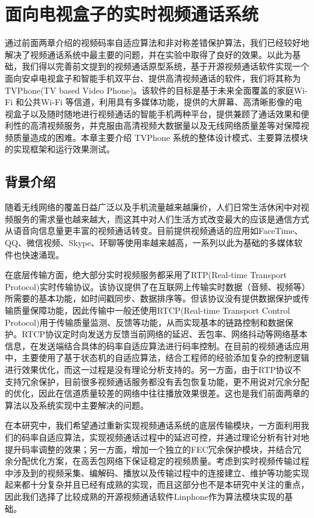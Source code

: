\chapter{面向电视盒子的实时视频通话系统}
\label{chap:system}
通过前面两章介绍的视频码率自适应算法和非对称差错保护算法，我们已经较好地解决了视频通话系统中最主要的问题，并在实验中取得了良好的效果。以此为基础，我们得以完善前文提到的视频通话原型系统，基于开源视频通话软件实现一个面向安卓电视盒子和智能手机双平台、提供高清视频通话的软件，我们将其称为TVPhone(TV based Video Phone)。该软件的目标是基于未来全面覆盖的家庭Wi-Fi 和公共Wi-Fi 等信道，利用具有多媒体功能，提供的大屏幕、高清晰影像的电视盒子以及随时随地进行视频通话的智能手机两种平台，提供兼顾了通话效果和便利性的高清视频服务，并克服由高清视频大数据量以及无线网络质量差等对保障视频质量造成的困难。本章主要介绍 TVPhone 系统的整体设计模式、主要算法模块的实现框架和运行效果测试。

\section{背景介绍}
随着无线网络的覆盖日益广泛以及手机流量越来越廉价，人们日常生活休闲中对视频服务的需求量也越来越大，而这其中对人们生活方式改变最大的应该是通信方式从语音向信息量更丰富的视频通话转变。目前提供视频通话的应用如FaceTime、QQ、微信视频、Skype、环聊等使用率越来越高，一系列以此为基础的多媒体软件也快速涌现。

在底层传输方面，绝大部分实时视频服务都采用了RTP(Real-time Transport Protocol)实时传输协议。该协议提供了在互联网上传输实时数据（音频、视频等）所需要的基本功能，如时间戳同步、数据排序等。但该协议没有提供数据保护或传输质量保障功能，因此传输中一般还使用RTCP(Real-time Transport Control Protocol)用于传输质量监测、反馈等功能，从而实现基本的链路控制和数据保护。RTCP协议定时向发送方反馈当前网络的延迟、丢包率、网络抖动等网络基本信息，在发送端结合具体的码率自适应算法进行码率控制。在目前的视频通话应用中，主要使用了基于状态机的自适应算法，结合工程师的经验添加复杂的控制逻辑进行效果优化，而这一过程是没有理论分析支持的。另一方面，由于RTP协议不支持冗余保护，目前很多视频通话服务都没有丢包恢复功能，更不用说对冗余分配的优化，因此在信道质量较差的网络中往往播放效果很差。这也是我们前面两章的算法以及系统实现中主要解决的问题。

在本研究中，我们希望通过重新实现视频通话系统的底层传输模块，一方面利用我们的码率自适应算法，实现视频通话过程中的延迟可控，并通过理论分析有针对地提升码率调整的效果；另一方面，增加一个独立的FEC冗余保护模块，并结合冗余分配优化方案，在高丢包网络下保证稳定的视频质量。考虑到实时视频传输过程中涉及到的视频采集、编解码、播放以及传输过程中的连接建立、维护等功能实现起来都十分复杂并且已经有成熟的实现，而且这部分也不是本研究中关注的重点，因此我们选择了比较成熟的开源视频通话软件Linphone\cite{website:linphone}作为算法模块实现的基础。


